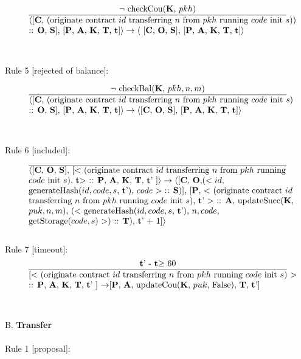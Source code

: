 \documentclass[a4paper]{llncs}
\begin{document}
\begin{equation}{}
\frac{\text{$\neg$ checkCou(\MANAGERS, $pkh$)}}{\parbox{4.2in}{\text{$\langle$[\ACCOUNTS, (originate contract ${id}$ transferring  ${n}$ from ${pkh}$ running ${code}$ init ${s}$))} \text{:: \OPERATIONS, \CONTRACTS], [\PENDING, \ACCEPTED, \MANAGERS, \CONTRACTORS, \TIME]$\rangle \rightarrow \langle$ [\ACCOUNTS, \OPERATIONS, \CONTRACTS],} \text{[\PENDING, \ACCEPTED, \MANAGERS, \CONTRACTORS, \TIME]$\rangle$}}} 
\end{equation}
~\\
~\\
Rule 5 [rejected of balance]:

\begin{equation}{}
\frac{\text{$\neg$ checkBal(\MANAGERS, $pkh, n, m$)}}{\parbox{4.2in}{\text{$\langle$[\ACCOUNTS, (originate contract ${id}$ transferring  ${n}$ from ${pkh}$ running ${code}$ init ${s}$)} \text{:: \OPERATIONS, \CONTRACTS], [\PENDING, \ACCEPTED, \MANAGERS, \CONTRACTORS, \TIME]$\rangle \rightarrow \langle$[\ACCOUNTS, \OPERATIONS, \CONTRACTS],} \text{[\PENDING, \ACCEPTED, \MANAGERS, \CONTRACTORS, \TIME]$\rangle$}}} 
\end{equation}
~\\
~\\
Rule 6 [included]:
\begin{equation}{}
\frac{}{\parbox{4.2in}{\text{$\langle$[\ACCOUNTS, \OPERATIONS, \CONTRACTS], [$<$ (originate contract ${id}$ transferring  ${n}$ from ${pkh}$ running } \\
\text{${code}$ init ${s}$), \TIME $>$ :: \PENDING, \ACCEPTED, \MANAGERS, \CONTRACTORS, \TIME' ]$\rangle \rightarrow \langle$[\ACCOUNTS, \OPERATIONS,($< id$, } \\
\text{generateHash($id, code, s$, \TIME'), $code >$ :: \CONTRACTS)], [\PENDING, $<$ (originate contract ${id}$ } \\
\text{transferring  ${n}$ from ${pkh}$ running ${code}$ init ${s}$), \TIME' $>$ :: \ACCEPTED, updateSucc(\MANAGERS, } \\
\text{$puk, n, m$), ($<$ generateHash($id, code, s$, \TIME'), $n, code$, } \\
 \text{getStorage($code, s$) $>$) :: \CONTRACTORS), \TIME' + 1]$\rangle$}}} 
\end{equation}
~\\
Rule 7 [timeout]:
\begin{equation}{}
\frac{\text{\TIME' - \TIME $\ge$ 60}}{\parbox{4.2in}{\text{[$<$ (originate contract ${id}$ transferring  ${n}$ from ${pkh}$ running ${code}$ init ${s}$) $>$ } \\
\text{:: \PENDING, \ACCEPTED, \MANAGERS, \CONTRACTORS, \TIME' ] $\rightarrow$[\PENDING, \ACCEPTED, updateCou(\MANAGERS, $puk$, False), \CONTRACTORS, \TIME']}}} 
\end{equation}
~\\
~\\
B. \textbf{Transfer}
\\
~\\
Rule 1 [proposal]:
\end{document}
